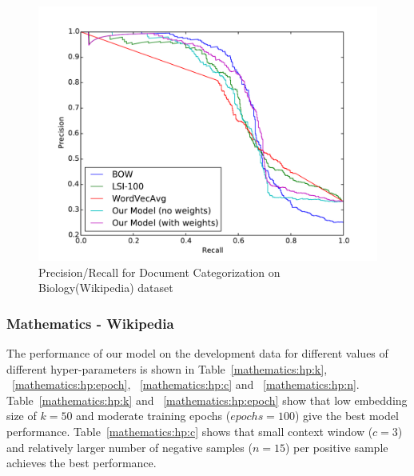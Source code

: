 \begin{figure}[tb]
\centering
        \includegraphics[width=0.8\columnwidth]{figs/pr/biology-cs.pdf}
    \caption{\footnotesize Precision/Recall for Document Categorization on Biology(Wikipedia) dataset}
    \label{fig:pr:biology:cs} 
\end{figure}

\subsubsection{Mathematics - Wikipedia}
The performance of our model on the development data for different values of different hyper-parameters is shown in Table~\ref{mathematics:hp:k}, ~\ref{mathematics:hp:epoch}, ~\ref{mathematics:hp:c} and ~\ref{mathematics:hp:n}. Table~\ref{mathematics:hp:k} and ~\ref{mathematics:hp:epoch} show that low embedding size of $k = 50$ and moderate training epochs ($epochs = 100$) give the best model performance. 
Table~\ref{mathematics:hp:c} shows that small context window ($c = 3$) and relatively larger number of negative samples ($n = 15$) per positive sample achieves the best performance.

